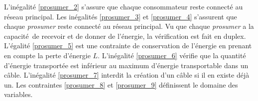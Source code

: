 


L'inégalité \ref{prosumer_2} s'assure que chaque consommateur reste connecté au réseau principal.
Les inégalités \ref{prosumer_3} et \ref{prosumer_4} s'assurent que chaque \textit{prosumer} reste connecté au réseau principal.
Vu que chaque \textit{prosumer} a la capacité de recevoir et de donner de l'énergie, la vérification
est fait en duplex.
L'égalité \ref{prosumer_5} est une contrainte de conservation de l'énergie en prenant en compte la perte d'énergie $L$.
L'inégalité \ref{prosumer_6} vérifie que la quantité d'énergie transportée est inférieur au maximum d'énergie transportable dans un câble.
L'inégalité \ref{prosumer_7} interdit la création d'un câble si il en existe déjà un.
Les contraintes \ref{prosumer_8} et \ref{prosumer_9} définissent le domaine des variables.

